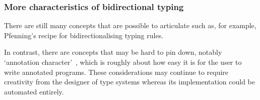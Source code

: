 \subsubsection{More characteristics of bidirectional typing}

There are still many concepts that are possible to articulate such as, for example, Pfenning's recipe for bidirectionalising typing rules.

In contrast, there are concepts that may be hard to pin down, notably `annotation character'~\cite{Dunfield2021}, which is roughly about how easy it is for the user to write annotated programs.
These considerations may continue to require creativity from the designer of type systems whereas its implementation could be automated entirely.

